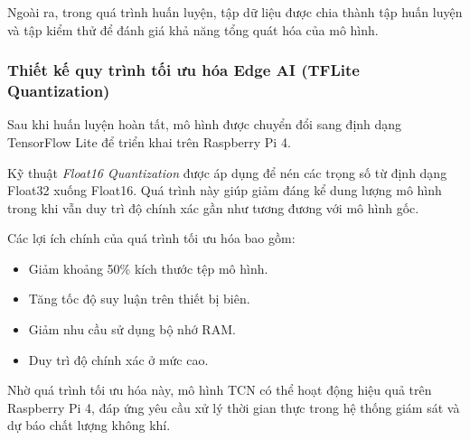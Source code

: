 Ngoài ra, trong quá trình huấn luyện, tập dữ liệu được chia thành tập huấn luyện và tập kiểm thử để đánh giá khả năng tổng quát hóa của mô hình.

\subsubsection{Thiết kế quy trình tối ưu hóa Edge AI (TFLite Quantization)}

Sau khi huấn luyện hoàn tất, mô hình được chuyển đổi sang định dạng TensorFlow Lite để triển khai trên Raspberry Pi 4.

Kỹ thuật \textit{Float16 Quantization} được áp dụng để nén các trọng số từ định dạng Float32 xuống Float16. Quá trình này giúp giảm đáng kể dung lượng mô hình trong khi vẫn duy trì độ chính xác gần như tương đương với mô hình gốc.

Các lợi ích chính của quá trình tối ưu hóa bao gồm:

\begin{itemize}
    \item Giảm khoảng 50\% kích thước tệp mô hình.
    \item Tăng tốc độ suy luận trên thiết bị biên.
    \item Giảm nhu cầu sử dụng bộ nhớ RAM.
    \item Duy trì độ chính xác ở mức cao.
\end{itemize}

Nhờ quá trình tối ưu hóa này, mô hình TCN có thể hoạt động hiệu quả trên Raspberry Pi 4, đáp ứng yêu cầu xử lý thời gian thực trong hệ thống giám sát và dự báo chất lượng không khí.

